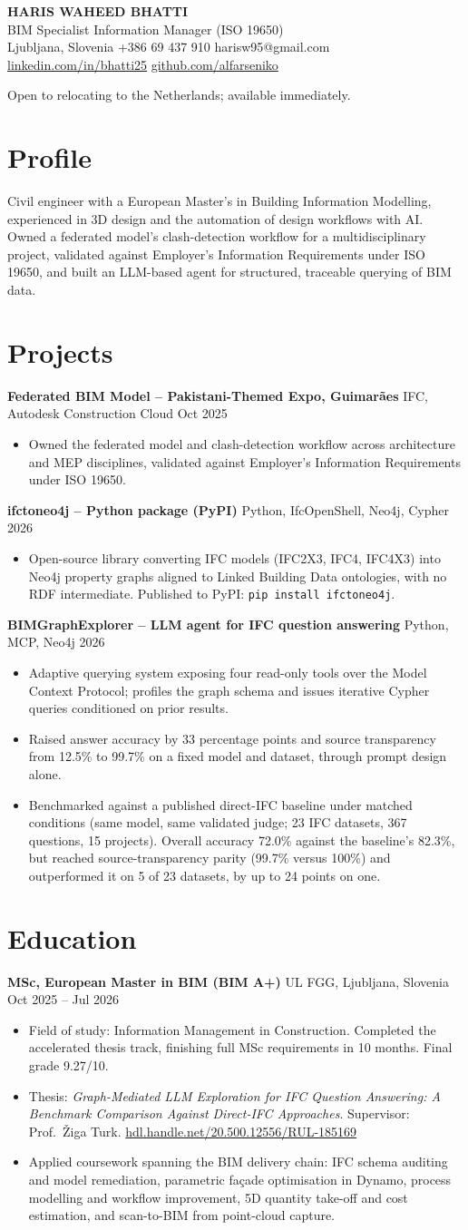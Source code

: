 \documentclass[a4paper,10.5pt]{article}
\newcommand{\datefill}{\dotfill}
\newcommand{\entry}[3]{\vspace{2.5pt}\noindent\textbf{#1} \textbar{} #2 \datefill{} #3\par\vspace{0.5pt}}
\newcommand{\ROLELINE}{BIM Specialist \textbar{} Information Manager (ISO 19650)}
\newcommand{\projIfcToNeo}{%
\entry{ifctoneo4j -- Python package (PyPI)}{Python, IfcOpenShell, Neo4j, Cypher}{2026}
\begin{itemize}
  \item Open-source library converting IFC models (IFC2X3, IFC4, IFC4X3) into Neo4j
        property graphs aligned to Linked Building Data ontologies, with no RDF
        intermediate. Published to PyPI: \texttt{pip install ifctoneo4j}.
\end{itemize}}
\newcommand{\projBIMGraph}{%
\entry{BIMGraphExplorer -- LLM agent for IFC question answering}{Python, MCP, Neo4j}{2026}
\begin{itemize}
  \item Adaptive querying system exposing four read-only tools over the Model
        Context Protocol; profiles the graph schema and issues iterative Cypher
        queries conditioned on prior results.
  \item Raised answer accuracy by 33 percentage points and source transparency from
        12.5\% to 99.7\% on a fixed model and dataset, through prompt design alone.
  \item Benchmarked against a published direct-IFC baseline under matched
        conditions (same model, same validated judge; 23 IFC datasets, 367
        questions, 15 projects). Overall accuracy 72.0\% against the baseline's
        82.3\%, but reached source-transparency parity (99.7\% versus 100\%) and
        outperformed it on 5 of 23 datasets, by up to 24 points on one.
\end{itemize}}
\newcommand{\projGuimaraes}{%
\entry{Federated BIM Model -- Pakistani-Themed Expo, Guimar\~aes}{IFC, Autodesk Construction Cloud}{Oct 2025}
\begin{itemize}
  \item Owned the federated model and clash-detection workflow across architecture
        and MEP disciplines, validated against Employer's Information Requirements
        under ISO 19650.
\end{itemize}}
\begin{document}
\begin{center}
  {\LARGE\bfseries HARIS WAHEED BHATTI}\\[2pt]
  {\large \ROLELINE}\\[3pt]
  Ljubljana, Slovenia \textbar{} +386 69 437 910 \textbar{} harisw95@gmail.com\\
  \href{https://linkedin.com/in/bhatti25}{linkedin.com/in/bhatti25} \textbar{}
  \href{https://github.com/alfarseniko}{github.com/alfarseniko}
\end{center}
\vspace{-4pt}
\noindent\small Open to relocating to the Netherlands; available immediately.\normalsize

\section{Profile}

\noindent Civil engineer with a European Master's in Building Information Modelling,
experienced in 3D design and the automation of design workflows with AI. Owned a
federated model's clash-detection workflow for a multidisciplinary project,
validated against Employer's Information Requirements under ISO 19650, and built an
LLM-based agent for structured, traceable querying of BIM data.

\section{Projects}

 \projGuimaraes \projIfcToNeo \projBIMGraph

\section{Education}
\entry{MSc, European Master in BIM (BIM A+)}{UL FGG, Ljubljana, Slovenia}{Oct 2025 -- Jul 2026}
\begin{itemize}
  \item Field of study: Information Management in Construction. Completed the
        accelerated thesis track, finishing full MSc requirements in 10 months.
        Final grade 9.27/10.
  \item Thesis: \textit{Graph-Mediated LLM Exploration for IFC Question Answering:
        A Benchmark Comparison Against Direct-IFC Approaches}. Supervisor:
        Prof.~\v{Z}iga Turk. \href{http://hdl.handle.net/20.500.12556/RUL-185169}{hdl.handle.net/20.500.12556/RUL-185169}
  \item Applied coursework spanning the BIM delivery chain: IFC schema auditing and model remediation, parametric façade optimisation in Dynamo, process modelling and workflow improvement, 5D quantity take-off and cost estimation, and scan-to-BIM from point-cloud capture.
\end{itemize}
\end{document}
